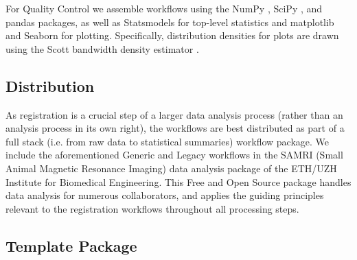 For Quality Control we assemble workflows using the NumPy \cite{numpy}, SciPy \cite{scipy}, and pandas \cite{pandas} packages, as well as Statsmodels \cite{statsmodels} for top-level statistics and matplotlib \cite{matplotlib} and Seaborn \cite{seaborn} for plotting.
Specifically, distribution densities for plots are drawn using the Scott bandwidth density estimator \cite{Scott1979}.


\subsection{Distribution}

As registration is a crucial step of a larger data analysis process (rather than an analysis process in its own right), the workflows are best distributed as part of a full stack (i.e. from raw data to statistical summaries) workflow package.
We include the aforementioned Generic and Legacy workflows in the SAMRI (Small Animal Magnetic Resonance Imaging) data analysis package \cite{samri} of the ETH/UZH Institute for Biomedical Engineering.
This Free and Open Source package handles data analysis for numerous collaborators, and applies the guiding principles relevant to the registration workflows throughout all processing steps.

\subsection{Template Package}


